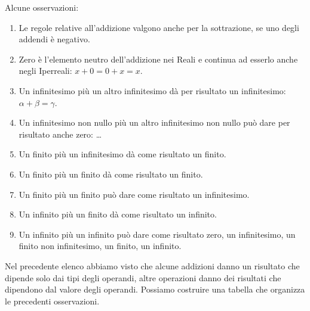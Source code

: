 \noindent \begin{minipage}{.5\textwidth}
Alcune osservazioni:

\begin{enumerate} [noitemsep]
 \item Le regole relative all'addizione valgono anche per la sottrazione, se 
uno degli addendi è negativo. 
 \item Zero è l'elemento neutro dell'addizione nei Reali e continua ad 
esserlo 
anche negli Iperreali: $x+0=0+x=x$.
 \item Un infinitesimo più un altro infinitesimo dà per risultato un 
infinitesimo: $\alpha+\beta=\gamma$.
 \item Un infinitesimo non nullo più un altro infinitesimo non nullo può dare 
per risultato anche zero: \dots
 \item Un finito più un infinitesimo dà come risultato un finito.
 \item Un finito più un finito dà come risultato un finito.
 \item Un finito più un finito può dare come risultato un infinitesimo.
 \item Un infinito più un finito dà come risultato un infinito.
 \item Un infinito più un infinito può dare come risultato zero, un 
infinitesimo, un finito non infinitesimo, un finito, un infinito.
\end{enumerate}

\end{minipage}
\hfill
\begin{minipage}{.45\textwidth}
Nel precedente elenco abbiamo visto che alcune addizioni danno un risultato 
che dipende solo dai tipi degli operandi, altre operazioni danno dei 
risultati 
che dipendono dal valore degli operandi. Possiamo costruire una tabella che 
organizza le precedenti osservazioni.

\begin{center}
\renewcommand{\arraystretch}{.0}
\end{center}
\vspace{2mm}
\end{minipage}

